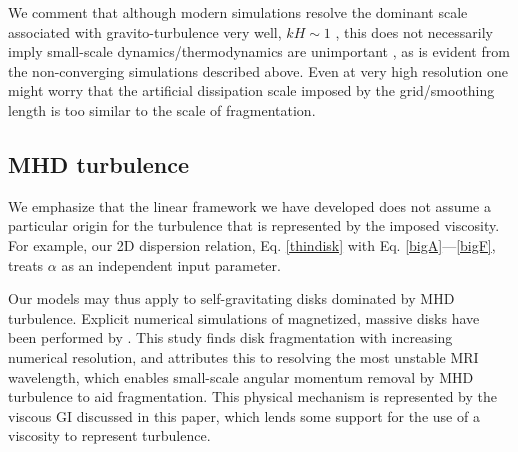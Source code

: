 We comment that although modern simulations resolve the dominant
scale associated with gravito-turbulence very well, $kH\sim 1$
\citep{cossins09}, this does not
necessarily imply small-scale dynamics/thermodynamics are unimportant 
\citep[especially for non-linear evolution, ][]{young15},  
as is evident from the non-converging simulations described above.   
Even at very high resolution one might worry that the artificial dissipation scale
imposed by the grid/smoothing length is too similar to the scale of fragmentation.

\subsection{MHD turbulence}\label{MHD}%
We emphasize that the linear framework we have developed does not assume  
a particular origin for the turbulence that is represented by the imposed
viscosity. For example, our 2D dispersion 
relation, Eq. \ref{thindisk} with Eq. \ref{bigA}---\ref{bigF}, treats 
$\alpha$ as an independent input parameter. 


Our models may thus apply to self-gravitating disks dominated by MHD
turbulence.     
Explicit numerical simulations of magnetized, massive disks have been performed 
by \cite{fromang05}. This study finds disk fragmentation with increasing numerical
resolution, and attributes this to resolving the most unstable MRI
wavelength, which enables small-scale angular momentum removal by MHD
turbulence to aid fragmentation. %
This physical mechanism is represented by the viscous GI 
discussed in this paper, which lends some support for  
the use of a viscosity to represent turbulence.    

